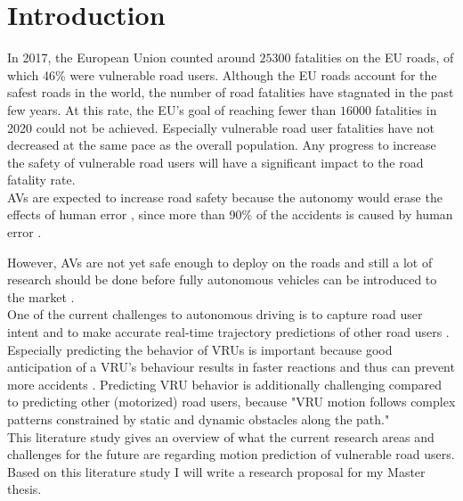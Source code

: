 \section{Introduction} \label{sec:intro}
In 2017, the European Union counted around $25300$ fatalities on the EU roads, of which 46\% were vulnerable road users. Although the EU roads account for the safest roads in the world, the number of road fatalities have stagnated in the past few years. At this rate, the EU's goal of reaching fewer than $16000$ fatalities in 2020 could not be achieved. Especially vulnerable road user fatalities have not decreased at the same pace as the overall population. Any progress to increase the safety of vulnerable road users will have a significant impact to the road fatality rate. \cite{vademecumeu2018road} \\

\glspl{AV} are expected to increase road safety because the autonomy would erase the effects of human error \cite{cui2019review}, since more than 90\% of the accidents is caused by human error \cite{eu2020website}.

However, \glspl{AV} are not yet safe enough to deploy on the roads and still a lot of research should be done before fully autonomous vehicles can be introduced to the market \cite{okuda2014survey} \cite{cui2019review}. \\

One of the current challenges to autonomous driving is to capture road user intent and to make accurate real-time trajectory predictions of other road users \cite{ohn2016looking}. Especially predicting the behavior of \glspl{VRU} is important \cite{ohn2016looking} \cite{cara2015classification} because good anticipation of a \gls{VRU}'s behaviour results in faster reactions and thus can prevent more accidents \cite{djuric2020uncertainty}. Predicting \gls{VRU} behavior is additionally challenging compared to predicting other (motorized) road users, because "\gls{VRU} motion follows complex patterns constrained by static and dynamic obstacles along the path." \cite{chou2020predicting} \\

This literature study gives an overview of what the current research areas and challenges for the future are regarding motion prediction of vulnerable road users. Based on this literature study I will write a research proposal for my Master thesis. \\

